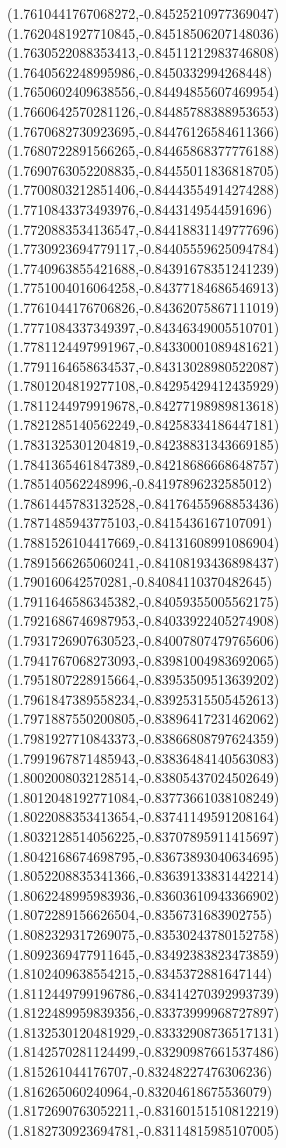 \documentclass[12pt]{article}
\theoremstyle{plain}
\theoremstyle{definition}
\theoremstyle{remark}
\begin{document}
\begin{figure}
{  (1.7610441767068272,-0.84525210977369047)%
  (1.7620481927710845,-0.84518506207148036)%
  (1.7630522088353413,-0.84511212983746808)%
  (1.7640562248995986,-0.8450332994268448)%
  (1.7650602409638556,-0.84494855607469954)%
  (1.7660642570281126,-0.84485788388953653)%
  (1.7670682730923695,-0.84476126584611366)%
  (1.7680722891566265,-0.84465868377776188)%
  (1.7690763052208835,-0.84455011836818705)%
  (1.7700803212851406,-0.84443554914274288)%
  (1.7710843373493976,-0.8443149544591696)%
  (1.7720883534136547,-0.84418831149777696)%
  (1.7730923694779117,-0.84405559625094784)%
  (1.7740963855421688,-0.84391678351241239)%
  (1.7751004016064258,-0.84377184686546913)%
  (1.7761044176706826,-0.84362075867111019)%
  (1.7771084337349397,-0.84346349005510701)%
  (1.7781124497991967,-0.84330001089481621)%
  (1.7791164658634537,-0.84313028980522087)%
  (1.7801204819277108,-0.84295429412435929)%
  (1.7811244979919678,-0.84277198989813618)%
  (1.7821285140562249,-0.84258334186447181)%
  (1.7831325301204819,-0.84238831343669185)%
  (1.7841365461847389,-0.84218686668648757)%
  (1.785140562248996,-0.84197896232585012)%
  (1.7861445783132528,-0.84176455968853436)%
  (1.7871485943775103,-0.8415436167107091)%
  (1.7881526104417669,-0.84131608991086904)%
  (1.7891566265060241,-0.84108193436898437)%
  (1.790160642570281,-0.84084110370482645)%
  (1.7911646586345382,-0.84059355005562175)%
  (1.7921686746987953,-0.84033922405274908)%
  (1.7931726907630523,-0.84007807479765606)%
  (1.7941767068273093,-0.83981004983692065)%
  (1.7951807228915664,-0.83953509513639202)%
  (1.7961847389558234,-0.83925315505452613)%
  (1.7971887550200805,-0.83896417231462062)%
  (1.7981927710843373,-0.83866808797624359)%
  (1.7991967871485943,-0.83836484140563083)%
  (1.8002008032128514,-0.83805437024502649)%
  (1.8012048192771084,-0.83773661038108249)%
  (1.8022088353413654,-0.83741149591208164)%
  (1.8032128514056225,-0.83707895911415697)%
  (1.8042168674698795,-0.83673893040634695)%
  (1.8052208835341366,-0.83639133831442214)%
  (1.8062248995983936,-0.83603610943366902)%
  (1.8072289156626504,-0.8356731683902755)%
  (1.8082329317269075,-0.83530243780152758)%
  (1.8092369477911645,-0.83492383823473859)%
  (1.8102409638554215,-0.8345372881647144)%
  (1.8112449799196786,-0.83414270392993739)%
  (1.8122489959839356,-0.83373999968727897)%
  (1.8132530120481929,-0.83332908736517131)%
  (1.8142570281124499,-0.83290987661537486)%
  (1.815261044176707,-0.83248227476306236)%
  (1.816265060240964,-0.83204618675536079)%
  (1.8172690763052211,-0.83160151510812219)%
  (1.8182730923694781,-0.83114815985107005)%
}
\end{figure}
\end{document}

